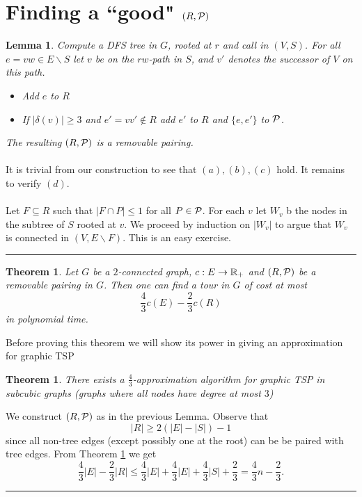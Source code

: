 \documentclass[letterpaper,12pt,oneside,onecolumn]{article}
\newenvironment{proof}{{\bf Proof:  }}{\hfill\rule{2mm}{2mm}}
\newtheorem{lemma}[fact]{Lemma}
\newtheorem{theorem}[fact]{Theorem}
\begin{document}
\section{Finding a ``good" $(R,\mathcal{P})$}
\begin{lemma}
Compute a DFS tree in $G$, rooted at $r$ and call in $(V,S)$. For all $e =vw \in E\backslash S$ let $v$ be on the $rw$-path in $S$, and $v'$ denotes the successor of $V$ on this path.
\begin{itemize}
\item Add $e$ to $R$
\item If $|\delta(v)| \geq 3$ and $e' = vv' \not\in R$ add $e' $ to $R$ and $\{e,e'\}$ to $\mathcal{P}$.
\end{itemize}
The resulting $(R,\mathcal{P})$ is a removable pairing.
\end{lemma}
\begin{proof}
\paragraph{} It is trivial from our construction to see that $(a),(b),(c)$ hold. It remains to verify $(d)$.
\paragraph{}
Let $F \subseteq R$ such that $|F\cap P |\leq 1$ for all $P \in \mathcal{P}$. For each $v$ let $W_v$ b the nodes in the subtree of $S$ rooted at $v$. We proceed by induction on $|W_v|$ to argue that $W_v$ is connected in $(V, E\backslash F)$. This is an easy exercise.
\end{proof}
\begin{theorem}\label{th:1}
Let $G$ be a $2$-connected graph, $c: E \rightarrow \mathbb{R}_+$ and $(R,\mathcal{P})$ be a removable pairing in $G$. Then one can find a tour in $G$ of cost at most $$\frac{4}{3}c(E) - \frac{2}{3}c(R)$$ in polynomial time.
\end{theorem}
Before proving this theorem we will show its power in giving an approximation for graphic TSP
\begin{theorem}
There exists a $\frac{4}{3}$-approximation algorithm for graphic TSP in subcubic graphs (graphs where all nodes have degree at most $3$)
\end{theorem}
\begin{proof}
We construct $(R,\mathcal{P})$ as in the previous Lemma. Observe that
$$|R| \geq 2(|E|-|S|) - 1$$
since all non-tree edges (except possibly one at the root) can be be paired with tree edges. From Theorem \ref{th:1} we get
$$\frac{4}{3}|E| - \frac{2}{3}|R| \leq \frac{4}{3} |E| + \frac{4}{3}|E| + \frac{4}{3}|S| + \frac{2}{3} = \frac{4}{3}n - \frac{2}{3}.$$
\end{proof}
\end{document}
